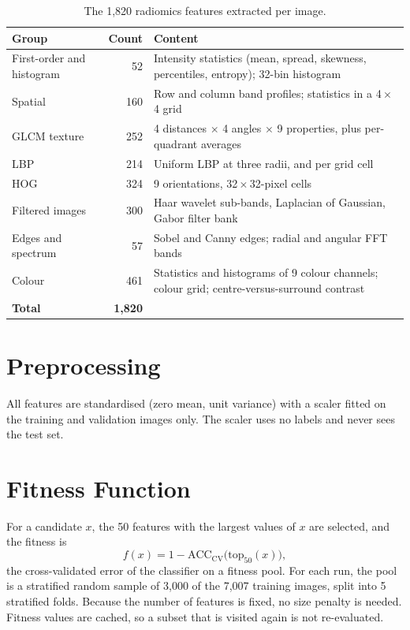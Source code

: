 \documentclass[12pt,a4paper]{report}
\begin{document}
\begin{table}[H]
\centering
\caption{The 1,820 radiomics features extracted per image.}
\label{tab:features}
\small
\begin{tabularx}{\textwidth}{|l|r|X|}
\hline
\textbf{Group} & \textbf{Count} & \textbf{Content} \\
\hline
First-order and histogram & 52 & Intensity statistics (mean, spread, skewness, percentiles, entropy); 32-bin histogram \\
\hline
Spatial & 160 & Row and column band profiles; statistics in a 4\,$\times$\,4 grid \\
\hline
GLCM texture & 252 & 4 distances $\times$ 4 angles $\times$ 9 properties, plus per-quadrant averages \\
\hline
LBP & 214 & Uniform LBP at three radii, and per grid cell \\
\hline
HOG & 324 & 9 orientations, 32\,$\times$\,32-pixel cells \\
\hline
Filtered images & 300 & Haar wavelet sub-bands, Laplacian of Gaussian, Gabor filter bank \\
\hline
Edges and spectrum & 57 & Sobel and Canny edges; radial and angular FFT bands \\
\hline
Colour & 461 & Statistics and histograms of 9 colour channels; colour grid; centre-versus-surround contrast \\
\hline
\textbf{Total} & \textbf{1,820} & \\
\hline
\end{tabularx}
\end{table}

\section{Preprocessing}
All features are standardised (zero mean, unit variance) with a scaler fitted on the training and validation images
only. The scaler uses no labels and never sees the test set.

\section{Fitness Function}
\label{sec:fitness}
For a candidate $x$, the 50 features with the largest values of $x$ are selected, and the fitness is
\begin{equation}
f(x) = 1 - \mathrm{ACC}_{\mathrm{CV}}\big(\mathrm{top}_{50}(x)\big),
\end{equation}
the cross-validated error of the classifier on a fitness pool. For each run, the pool is a stratified random sample
of 3,000 of the 7,007 training images, split into 5 stratified folds. Because the number of features is fixed, no
size penalty is needed. Fitness values are cached, so a subset that is visited again is not re-evaluated.
\end{document}
